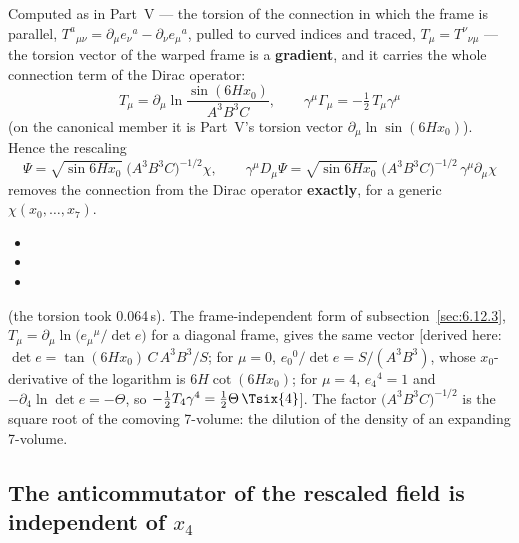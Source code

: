 Computed as in Part~V --- the torsion of the connection in which the frame is parallel,
$T^a{}_{\mu\nu}=\partial_\mu e_\nu{}^a-\partial_\nu e_\mu{}^a$, pulled to curved indices and traced,
$T_\mu=T^\nu{}_{\nu\mu}$ --- the torsion vector of the warped frame is a \textbf{gradient}, and it carries
the whole connection term of the Dirac operator:
\[
  T_\mu=\partial_\mu\ln\frac{\sin(6Hx_0)}{A^3B^3C},\qquad \gamma^\mu\Gamma_\mu=-\tfrac12\,T_\mu\gamma^\mu
\]
(on the canonical member it is Part~V's torsion vector $\partial_\mu\ln\sin(6Hx_0)$). Hence the rescaling
\[
  \Psi=\sqrt{\sin 6Hx_0}\;\bigl(A^3B^3C\bigr)^{-1/2}\chi,\qquad
  \gamma^\mu D_\mu\Psi=\sqrt{\sin 6Hx_0}\;\bigl(A^3B^3C\bigr)^{-1/2}\,\gamma^\mu\partial_\mu\chi
\]
removes the connection from the Dirac operator \textbf{exactly}, for a generic $\chi(x_0,\dots,x_7)$.
\begin{itemize}
  \item {}
  \item {}
  \item {}
\end{itemize}
(the torsion took 0.064\,s). The frame-independent form of subsection~\ref{sec:6.12.3},
$T_\mu=\partial_\mu\ln\bigl(e_\mu{}^\mu/\det e\bigr)$ for a diagonal frame, gives the same vector [derived
here: $\det e=\tan(6Hx_0)\,C\,A^3B^3/S$; for $\mu=0$, $e_0{}^0/\det e=S/(A^3B^3)$, whose $x_0$-derivative
of the logarithm is $6H\cot(6Hx_0)$; for $\mu=4$, $e_4{}^4=1$ and $-\partial_4\ln\det e=-\Theta$, so
$-\tfrac12T_4\gamma^4=\tfrac12\Theta\,\Tsix{4}$]. The factor $\bigl(A^3B^3C\bigr)^{-1/2}$ is the square root of
the comoving 7-volume: the dilution of the density of an expanding 7-volume.

\subsection{The anticommutator of the rescaled field is independent of \texorpdfstring{$x_4$}{x4}}
\label{sec:6.19}

